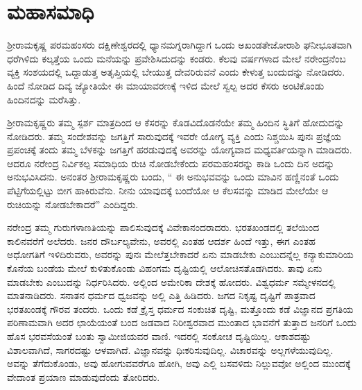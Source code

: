 
\chapter{ಮಹಾಸಮಾಧಿ }

 ಶ‍್ರೀರಾಮಕೃಷ್ಣ ಪರಮಹಂಸರು ದಕ್ಷಿಣೇಶ್ವರದಲ್ಲಿ ಧ್ಯಾನಮಗ್ನರಾಗಿದ್ದಾಗ ಒಂದು ಅಖಂಡತೇಜೋರಾಶಿ ಘನೀಭೂತವಾಗಿ ಧರೆಗಿಳಿದು ಕಲ್ಕತ್ತೆಯ ಒಂದು ಮನೆಯನ್ನು ಪ್ರವೇಶಿಸಿದುದನ್ನು ಕಂಡರು. ಕೆಲವು ವರ್ಷಗಳಾದ ಮೇಲೆ ನರೇಂದ್ರನೆಂಬ ವ್ಯಕ್ತಿ ಸಂಶಯದಲ್ಲಿ ಒದ್ದಾಡುತ್ತ ಅತೃಪ್ತಿಯಲ್ಲಿ ಬೇಯುತ್ತ ದೇವರಿರುವನೆ ಎಂದು ಕೇಳುತ್ತ ಬಂದುದನ್ನು ನೋಡಿದರು. ಹಿಂದೆ ನೋಡಿದ ದಿವ್ಯ ಜ್ಯೋತಿಯೇ ಈ ಮಾಯಾವರಣಕ್ಕೆ ಇಳಿದ ಮೇಲೆ ಸ್ವಲ್ಪ ಅದರ ಕೆಸರು ಅಂಟಿಕೊಂಡು ಹಿಂದಿನದನ್ನು ಮರೆಸಿತ್ತು. 

 ಶ‍್ರೀರಾಮಕೃಷ್ಣರು ತಮ್ಮ ಸ್ಪರ್ಶ ಮಾತ್ರದಿಂದ ಆ ಕೆಸರನ್ನು ಕೊಡವಿದೊಡನೆಯೇ ತಮ್ಮ ಹಿಂದಿನ ಸ್ಥಿತಿಗೆ ಹೋದುದನ್ನು ನೋಡಿದರು. ತಮ್ಮ ಸಂದೇಶವನ್ನು ಜಗತ್ತಿಗೆ ಸಾರುವುದಕ್ಕೆ ಇವರೇ ಯೋಗ್ಯ ವ್ಯಕ್ತಿ ಎಂದು ನಿಶ್ಚಯಿಸಿ ಪುನಃ ಪ್ರಜ್ಞೆಯ ಪ್ರಪಂಚಕ್ಕೆ ತಂದು ತಮ್ಮ ಬೆಳಕನ್ನು ಜಗತ್ತಿಗೆ ಹರಡುವುದಕ್ಕೆ ಅವರನ್ನು ಯೋಗ್ಯವಾದ ಮಧ್ಯವರ್ತಿಯನ್ನಾಗಿ ಮಾಡಿದರು. ಆದರೂ ನರೇಂದ್ರ ನಿರ್ವಿಕಲ್ಪ ಸಮಾಧಿಯ ರುಚಿ ನೋಡಬೇಕೆಂದು ಪರಮಹಂಸರನ್ನು ಕಾಡಿ ಒಂದು ದಿನ ಅದನ್ನು ಅನುಭವಿಸಿದನು. ಅನಂತರ ಶ‍್ರೀರಾಮಕೃಷ್ಣರು ಬಂದು, “ ಈ ಅನುಭವವನ್ನು ಒಂದು ಮಾವಿನ ಹಣ್ಣಿನಂತೆ ಒಂದು ಪೆಟ್ಟಿಗೆಯಲ್ಲಿಟ್ಟು ಬೀಗ ಹಾಕಿರುವೆನು. ನೀನು ಯಾವುದಕ್ಕೆ ಬಂದೆಯೋ ಆ ಕೆಲಸವನ್ನು ಮಾಡಿದ ಮೇಲೆಯೇ ಆ ರುಚಿಯನ್ನು ನೋಡಬೇಕಾದರೆ” ಎಂದಿದ್ದರು. 

 ನರೇಂದ್ರ ತಮ್ಮ ಗುರುಗಳಾಣತಿಯನ್ನು ಪಾಲಿಸುವುದಕ್ಕೆ ವಿವೇಕಾನಂದರಾದರು. ಭರತಖಂಡದಲ್ಲಿ ತಲೆಯಿಂದ ಕಾಲಿನವರೆಗೆ ಅಲೆದರು. ಜನರ ದೌರ್ಬಲ್ಯವೇನು, ಅವರಲ್ಲಿ ಎಂತಹ ಆದರ್ಶ ಹಿಂದೆ ಇತ್ತು, ಈಗ ಎಂತಹ ಅಧೋಗತಿಗೆ ಇಳಿದಿರುವರು, ಅವರನ್ನು ಪುನಃ ಮೇಲೆತ್ತಬೇಕಾದರೆ ಏನು ಮಾಡಬೇಕು ಎಂಬುದನ್ನೆಲ್ಲ ಕನ್ಯಾಕುಮಾರಿಯ ಕೊನೆಯ ಬಂಡೆಯ ಮೇಲೆ ಕುಳಿತುಕೊಂಡು ವಿಹಂಗಮ ದೃಷ್ಟಿಯಲ್ಲಿ ಆಲೋಚಿಸತೊಡಗಿದರು. ತಾವು ಏನು ಮಾಡಬೇಕು ಎಂಬುದನ್ನು ನಿರ್ಧರಿಸಿದರು. ಅಲ್ಲಿಂದ ಅಮೇರಿಕಾ ದೇಶಕ್ಕೆ ಹೋದರು. ವಿಶ್ವಧರ್ಮ ಸಮ್ಮೇಳನದಲ್ಲಿ ಮಾತನಾಡಿದರು. ಸನಾತನ ಧರ್ಮದ ಧ್ವಜವನ್ನು ಅಲ್ಲಿ ಎತ್ತಿ ಹಿಡಿದರು. ಜಗದ ನಿಕೃಷ್ಟ ದೃಷ್ಟಿಗೆ ಪಾತ್ರವಾದ ಭರತಖಂಡಕ್ಕೆ ಗೌರವ ತಂದರು. ಒಂದು ಕಡೆ ಕ್ರೈಸ್ತ ಧರ್ಮದ ಸಂಕುಚಿತ ದೃಷ್ಟಿ, ಮತ್ತೊಂದು ಕಡೆ ವಿಜ್ಞಾನದ ಪ್ರಗತಿಯ ಪರಿಣಾಮವಾಗಿ ಅದರ ಛಾಯೆಯಂತೆ ಬಂದ ಜಡವಾದ ನಿರೀಶ್ವರವಾದ ಮುಂತಾದ ಭಾವನೆಗೆ ತುತ್ತಾದ ಜನರಿಗೆ ಒಂದು ಹೊಸ ಭರವಸೆಯಂತೆ ಬಂತು ಸ್ವಾಮೀಜಿಯವರ ವಾಣಿ. ಇದರಲ್ಲಿ ಸಂಕೋಚ ದೃಷ್ಟಿಯಿಲ್ಲ. ಆಕಾಶದಷ್ಟು ವಿಶಾಲವಾಗಿದೆ, ಸಾಗರದಷ್ಟು ಆಳವಾಗಿದೆ. ವಿಜ್ಞಾನವನ್ನು ಧಿಃಕರಿಸುವುದಿಲ್ಲ. ವಿಚಾರವನ್ನು ಅಲ್ಲಗಳೆಯುವುದಿಲ್ಲ. ಅವನ್ನು ತೆಗೆದುಕೊಂಡು, ಅವು ಹೋಗುವವರೆಗೂ ಹೋಗಿ, ಅವು ಎಲ್ಲಿ ಬಸವಳಿದು ನಿಲ್ಲುವವೋ ಅಲ್ಲಿಂದ ಮುಂದಕ್ಕೆ ವೇದಾಂತ ಪ್ರಯಾಣ ಮಾಡುವುದೆಂದು ತೋರಿದರು. 

